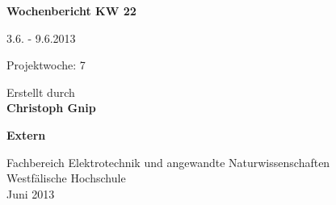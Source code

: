 
\begin{center}
{\Huge \textbf{Wochenbericht KW 22}\par}
\vspace{1cm}
{\Huge 3.6. - 9.6.2013\par}
\vspace{1cm}
{\Huge Projektwoche: 7\par}

\vspace{2cm}

\large{Erstellt durch}\\
\Large{\textbf{Christoph Gnip}}


\vspace{4cm}

\Large{\textbf{Extern}}

\vfill

{\normalsize Fachbereich Elektrotechnik und angewandte Naturwissenschaften\\
Westfälische Hochschule\\[2ex]Juni 2013}


\end{center}
\newpage